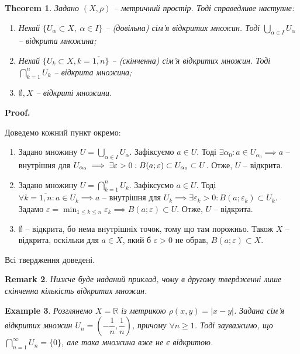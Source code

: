 \documentclass[a4paper, 10pt]{article}
\makeatletter
\theoremstyle{theoremdd}
\newtheorem{theorem}{Theorem}[subsection]
\theoremstyle{theoremdd}
\theoremstyle{theoremdd}
\theoremstyle{theoremdd}
\newtheorem{example}[theorem]{Example}
\theoremstyle{theoremdd}
\theoremstyle{theoremdd}
\newtheorem{remark}[theorem]{Remark}
\theoremstyle{theoremdd}
\theoremstyle{theoremdd}
\renewenvironment{proof}[1][Proof.\\]{\par
\pushQED{\hfill \qed}%
\normalfont \topsep6\p@\@plus6\p@\relax
\trivlist
\item\relax
{\bfseries
#1\@addpunct{.}}\hspace\labelsep\ignorespaces
}{%
\popQED\endtrivlist\@endpefalse
}
\makeatother
\begin{document}
\begin{theorem} 
Задано $(X,\rho)$ -- метричний простір. Тоді справедливе наступне:
\begin{enumerate}[nosep,wide=0pt,label={\arabic*)}]
\item Нехай $\{U_{\alpha} \subset X,\ \alpha \in I\}$ -- (довільна) сім'я відкритих множин. Тоді $\displaystyle \bigcup_{\alpha \in I} U_{\alpha}$ -- відкрита множина;
\item Нехай $\{U_k \subset X, k = \overline{1,n}\}$ -- (скінченна) сім'я відкритих множин. Тоді $\displaystyle \bigcap_{k=1}^n U_k$ -- відкрита множина;
\item $\emptyset, X$ -- відкриті множини.
\end{enumerate}
\end{theorem}

\begin{proof}
Доведемо кожний пункт окремо:
\begin{enumerate}[wide=0pt,label={\arabic*)}]
\item Задано множину $U = \displaystyle \bigcup_{\alpha \in I} U_{\alpha}$. Зафіксуємо $a \in U$. Тоді $\exists \alpha_0: a \in U_{\alpha_0} \implies a$ -- внутрішня для $U_{\alpha_0} \\ \implies \exists \varepsilon > 0: B(a;\varepsilon) \subset U_{\alpha_0} \subset U$. Отже, $U$ -- відкрита.

\item Задано множину $U = \displaystyle \bigcap_{k=1}^n U_k$. Зафіксуємо $a \in U$. Тоді $\forall k = \overline{1,n}: a \in U_k \implies a$ -- внутрішня для $U_k \implies \exists \varepsilon_k > 0: B(a;\varepsilon_k) \subset U_k$. Задамо $\varepsilon = \displaystyle\min_{1 \leq k \leq n} \varepsilon_k \implies B(a;\varepsilon) \subset U$. Отже, $U$ -- відкрита.

\item $\emptyset$ -- відкрита, бо нема внутрішніх точок, тому що там порожньо. Також $X$ -- відкрита, оскільки для $a \in X$, який б $\varepsilon > 0$ не обрав, $B(a;\varepsilon) \subset X$.
\end{enumerate}
Всі твердження доведені.
\end{proof}

\begin{remark}
Нижче буде наданий приклад, чому в другому твердженні лише скінченна кількість відкритих множин.
\end{remark}

\begin{example}
Розглянемо $X = \mathbb{R}$ із метрикою $\rho(x,y) = |x-y|$. Задана сім'я відкритих множин $U_n = \left( -\dfrac{1}{n}, \dfrac{1}{n} \right)$, причому $\forall n \geq 1$. Тоді зауважимо, що $\displaystyle\bigcap_{n=1}^\infty U_n = \{0\}$, але така множина вже не є відкритою.
\end{example}
\end{document}
